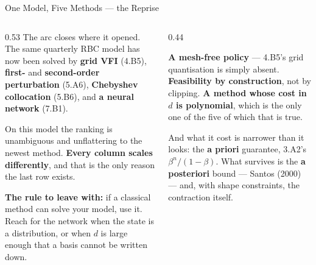 \begin{frame}{One Model, Five Methods --- the Reprise}
\begin{columns}[T]
\begin{column}{0.53\textwidth}
\small
The arc closes where it opened. The same quarterly RBC model has now been solved by \textbf{grid VFI} (4.B5), \textbf{first-} and \textbf{second-order perturbation} (5.A6), \textbf{Chebyshev collocation} (5.B6), and \textbf{a neural network} (7.B1).
\medskip

On this model the ranking is unambiguous and unflattering to the newest method. \textbf{Every column scales differently}, and that is the only reason the last row exists.
\medskip

\textbf{The rule to leave with:} if a classical method can solve your model, use it. Reach for the network when the state is a distribution, or when $d$ is large enough that a basis cannot be written down.
\end{column}
\begin{column}{0.44\textwidth}
\begin{takeawaybox}[title=\textbf{What the network did buy, even here}]\small
\textbf{A mesh-free policy} --- 4.B5's grid quantisation is simply absent.
\medskip
\textbf{Feasibility by construction}, not by clipping.
\medskip
\textbf{A method whose cost in $d$ is polynomial}, which is the only one of the five of which that is true.
\end{takeawaybox}
\medskip
\begin{cautionbox}\footnotesize
And what it cost is narrower than it looks: the \textbf{a priori} guarantee, 3.A2's $\beta^{n}/(1-\beta)$. What survives is the \textbf{a posteriori} bound --- Santos (2000) --- and, with shape constraints, the contraction itself.
\end{cautionbox}
\end{column}
\end{columns}
\vspace{1mm}
\end{frame}

